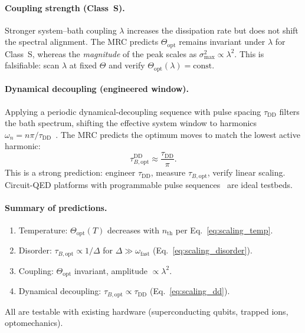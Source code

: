 \documentclass[11pt,letterpaper]{article}
\begin{document}
\paragraph{Coupling strength (Class~S).} Stronger system--bath coupling $\lambda$ increases the dissipation rate but does not shift the spectral alignment. The MRC predicts $\Theta_{\text{opt}}$ remains invariant under $\lambda$ for Class~S, whereas the \emph{magnitude} of the peak scales as $\sigma^2_{\text{max}}\propto\lambda^2$. This is falsifiable: scan $\lambda$ at fixed $\Theta$ and verify $\Theta_{\text{opt}}(\lambda)=\text{const}$.

\paragraph{Dynamical decoupling (engineered window).} Applying a periodic dynamical-decoupling sequence with pulse spacing $\tau_{\text{DD}}$ filters the bath spectrum, shifting the effective system window to harmonics $\omega_n = n\pi/\tau_{\text{DD}}$~\cite{Plenio1998}. The MRC predicts the optimum moves to match the lowest active harmonic:
\begin{equation}
\tau_{B,\text{opt}}^{\text{DD}} \approx \frac{\tau_{\text{DD}}}{\pi}.
\label{eq:scaling_dd}
\end{equation}
This is a strong prediction: engineer $\tau_{\text{DD}}$, measure $\tau_{B,\text{opt}}$, verify linear scaling. Circuit-QED platforms with programmable pulse sequences~\cite{blais2020_cqed} are ideal testbeds.

\paragraph{Summary of predictions.}
\begin{enumerate}[leftmargin=*,noitemsep,topsep=0pt]
\item Temperature: $\Theta_{\text{opt}}(T)$ decreases with $n_{\text{th}}$ per Eq.~\eqref{eq:scaling_temp}.
\item Disorder: $\tau_{B,\text{opt}}\propto 1/\Delta$ for $\Delta\gg\omega_{\mathrm{fast}}$ (Eq.~\ref{eq:scaling_disorder}).
\item Coupling: $\Theta_{\text{opt}}$ invariant, amplitude $\propto\lambda^2$.
\item Dynamical decoupling: $\tau_{B,\text{opt}}\propto\tau_{\text{DD}}$ (Eq.~\ref{eq:scaling_dd}).
\end{enumerate}
All are testable with existing hardware (superconducting qubits, trapped ions, optomechanics).
\end{document}
